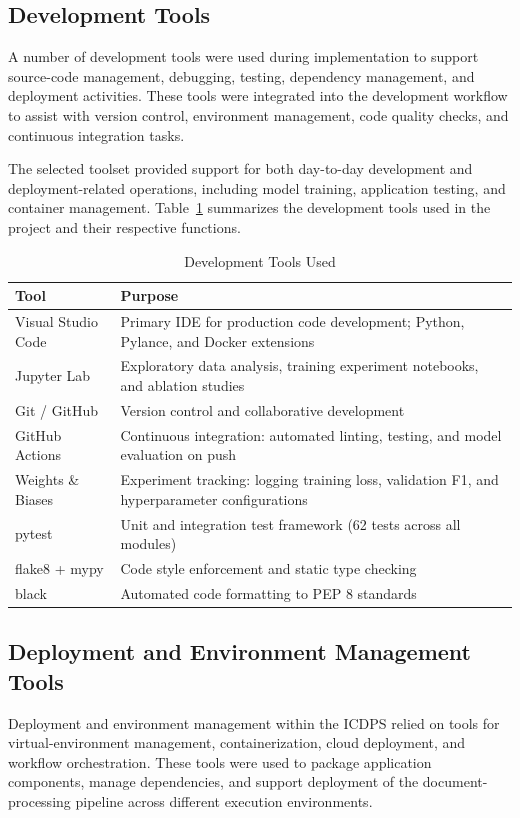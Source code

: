 \subsection{Development Tools}
A number of development tools were used during implementation to support source-code management, debugging, testing, dependency management, and deployment activities. These tools were integrated into the development workflow to assist with version control, environment management, code quality checks, and continuous integration tasks.

The selected toolset provided support for both day-to-day development and deployment-related operations, including model training, application testing, and container management. Table~\ref{tab:dev_tools} summarizes the development tools used in the project and their respective functions.

\begin{table}[htbp]
\centering
\caption{Development Tools Used}
\label{tab:dev_tools}
\begin{tabular}{|p{4.5cm}|p{9.5cm}|}
\hline
\textbf{Tool} & \textbf{Purpose} \\
\hline
Visual Studio Code & Primary IDE for production code development; Python, Pylance, and Docker extensions \\
\hline
Jupyter Lab & Exploratory data analysis, training experiment notebooks, and ablation studies \\
\hline
Git / GitHub & Version control and collaborative development \\
\hline
GitHub Actions & Continuous integration: automated linting, testing, and model evaluation on push \\
\hline
Weights \& Biases & Experiment tracking: logging training loss, validation F1, and hyperparameter configurations \\
\hline
pytest & Unit and integration test framework (62 tests across all modules) \\
\hline
flake8 + mypy & Code style enforcement and static type checking \\
\hline
black & Automated code formatting to PEP 8 standards \\
\hline
\end{tabular}
\end{table}

\subsection{Deployment and Environment Management Tools}
Deployment and environment management within the ICDPS relied on tools for virtual-environment management, containerization, cloud deployment, and workflow orchestration. These tools were used to package application components, manage dependencies, and support deployment of the document-processing pipeline across different execution environments.

